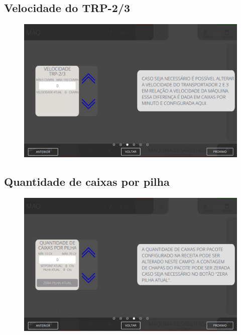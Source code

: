 \newpage
\thispagestyle{fancy}
\vspace*{40 pt}
\subsection{\small Velocidade do TRP-2/3}
\vspace*{\fill}
\begin{figure}[h]
    \centering
    \includegraphics[width=576 px,height=360 px]{src/imagesICV/08-stacker/settings/3.png}
\end{figure}
\vspace*{\fill}

\newpage
\thispagestyle{fancy}
\vspace*{40 pt}
\subsection{\small Quantidade de caixas por pilha}
\vspace*{\fill}
\begin{figure}[h]
    \centering
    \includegraphics[width=576 px,height=360 px]{src/imagesICV/08-stacker/settings/4.png}
\end{figure}
\vspace*{\fill}


